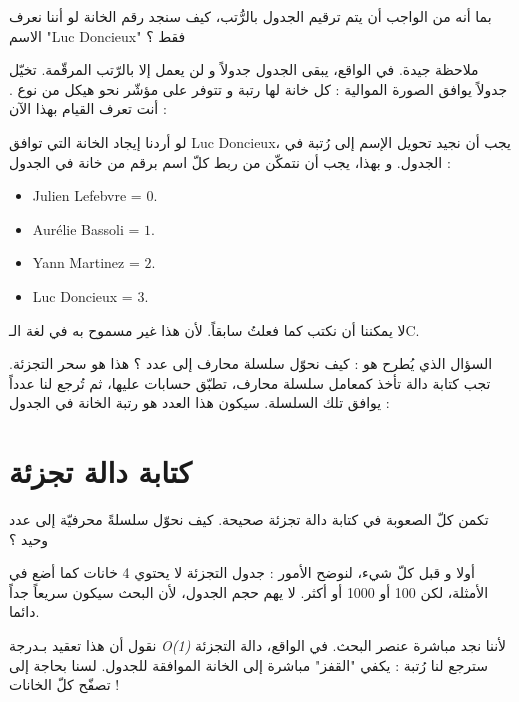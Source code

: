 \begin{question}
بما أنه من الواجب أن يتم ترقيم الجدول بالرُّتب، كيف سنجد رقم الخانة لو أننا نعرف الاسم
"\textenglish{Luc Doncieux}"
 فقط ؟
\end{question}

ملاحظة جيدة. في الواقع، يبقى الجدول جدولاً و لن يعمل إلا بالرّتب المرقّمة. تخيّل جدولاً يوافق الصورة الموالية : كل خانة لها رتبة و تتوفر على مؤشّر نحو هيكل من نوع
.
أنت تعرف القيام بهذا الآن :


 لو أردنا إيجاد الخانة التي توافق
\textenglish{Luc Doncieux}،
 يجب أن نجيد تحويل الإسم إلى رُتبة في الجدول. و بهذا، يجب أن نتمكّن من ربط كلّ اسم برقم من خانة في الجدول :

\begin{itemize}
	\item \textenglish{Julien Lefebvre} = $0$.
	\item \textenglish{Aurélie Bassoli} = $1$.
	\item \textenglish{Yann Martinez} = $2$.
	\item \textenglish{Luc Doncieux} = $3$.
\end{itemize}

لا يمكننا أن نكتب
كما فعلتُ سابقاً. لأن هذا غير مسموح به في لغة الـ\textenglish{C}.

السؤال الذي يُطرح هو : كيف نحوّل سلسلة محارف إلى عدد ؟ هذا هو سحر التجزئة. تجب كتابة دالة تأخذ كمعامل سلسلة محارف، تطبّق حسابات عليها، ثم تُرجع لنا عدداً يوافق تلك السلسلة. سيكون هذا العدد هو رتبة الخانة في الجدول :


\section{كتابة دالة تجزئة}

تكمن كلّ الصعوبة في كتابة دالة تجزئة صحيحة. كيف نحوّل سلسلةً محرفيّة إلى عدد وحيد ؟

أولا و قبل كلّ شيء، لنوضح الأمور : جدول التجزئة لا يحتوي 4 خانات كما أضع في الأمثلة، لكن 100 أو 1000 أو أكثر. لا يهم حجم الجدول، لأن البحث سيكون سريعاً جداً دائما.

\begin{information}
نقول أن هذا تعقيد بـدرجة
\textit{\textenglish{O(1)}}
لأننا نجد مباشرة عنصر البحث. في الواقع، دالة التجزئة سترجع لنا رُتبة : يكفي "القفز" مباشرة إلى الخانة الموافقة للجدول. لسنا بحاجة إلى تصفّح كلّ الخانات !
\end{information}

